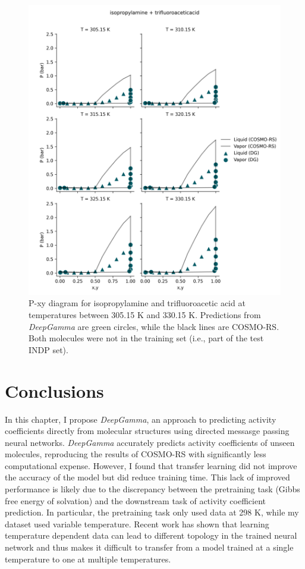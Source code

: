 \begin{figure}
    \centering
    \includegraphics[trim=0 0 0 40, clip, width=\textwidth]{gfx/Chapter07/high_error_pxy.png}
    \caption{P-xy diagram for isopropylamine and trifluoroacetic acid at temperatures between 305.15 K and 330.15 K. Predictions from \textit{DeepGamma} are green circles, while the black lines are COSMO-RS. Both molecules were not in the training set (i.e., part of the test INDP set).}
    \label{fig:high_error_dg_prediction}
\end{figure}



\section{Conclusions}

In this chapter, I propose \textit{DeepGamma}, an approach to predicting activity coefficients directly from molecular structures using directed messasge passing neural networks. \textit{DeepGamma} accurately predicts activity coefficients of unseen molecules, reproducing the results of COSMO-RS with significantly less computational expense. However, I found that transfer learning did not improve the accuracy of the model but did reduce training time. This lack of improved performance is likely due to the discrepancy between the pretraining task (Gibbs free energy of solvation) and the downstream task of activity coefficient prediction. In particular, the pretraining task only used data at 298 K, while my dataset used variable temperature. Recent work \cite{Lansford2023} has shown that learning temperature dependent data can lead to different topology in the trained neural network and thus makes it difficult to transfer from a model trained at a single temperature to one at multiple temperatures.

